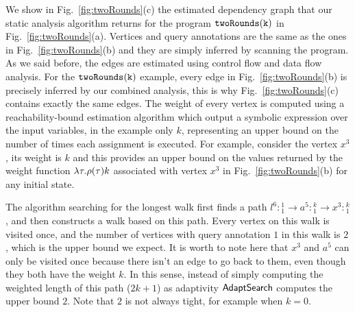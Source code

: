 \begin{example}[twoRounds]    
    We show in Fig.~\ref{fig:twoRounds}(c) the estimated dependency graph that our static analysis algorithm returns for the program $\mathtt{twoRounds(k)}$ in Fig.~\ref{fig:twoRounds}(a).
    Vertices and query annotations are the same as the ones in Fig.~\ref{fig:twoRounds}(b) and they are simply inferred by scanning the program.
    As we said before, the edges are estimated using control flow and data flow analysis.
    For the $\mathtt{twoRounds(k)}$ example, every edge in Fig.~\ref{fig:twoRounds}(b) is precisely inferred by our combined analysis, this is why Fig.~\ref{fig:twoRounds}(c) contains exactly the same edges.
    The weight of every vertex is computed using a reachability-bound estimation algorithm which output a symbolic expression over the input variables, in the example only $k$, representing an upper bound on the number of times each assignment is executed.
    For example, consider the vertex $x^{3}$, its weight is $k$ and this provides an upper bound on the values returned by the weight function $\lambda \mathtt{\tau}. \rho(\mathtt{\tau})k$ associated with vertex $x^{3}$ in Fig.~\ref{fig:twoRounds}(b) for any initial state. 
    
    The algorithm searching for the longest walk first finds a path $l^6:{}^1_1 \to a^5: {}^k_1 \to x^3: {}^k_1$, and then constructs a walk based on this path. Every vertex on this walk is visited once, and the number of vertices with query annotation $1$ in this walk is $2$, which is the upper bound we expect.
    {It is worth to note here that $x^3$ and $a^5$ can only be visited once because there isn't an edge to go back to them, even though they both have the weight $k$}.
    In this sense, instead of simply computing the weighted length of this path ($2k+1$) as adaptivity $\mathsf{AdaptSearch}$ computes the upper bound $2$. Note that $2$ is not always tight, for example when $k = 0$.
    

\end{example}

